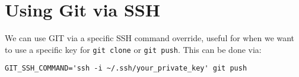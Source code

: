 \section{Using Git via SSH}
We can use GIT via a specific SSH command override, useful for when we want to use a specific key for \texttt{git clone} or \texttt{git push}. This can be done via:

\verb|GIT_SSH_COMMAND='ssh -i ~/.ssh/your_private_key' git push|